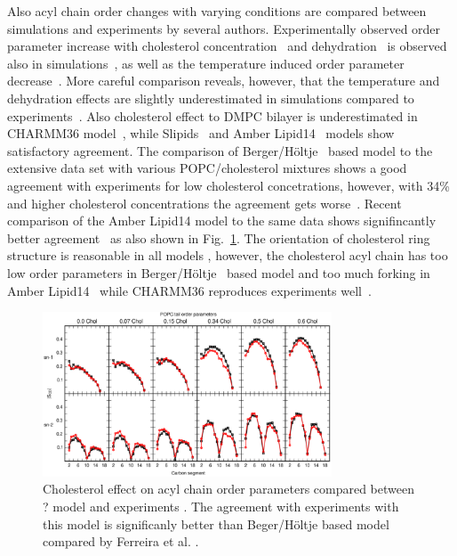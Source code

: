 \documentclass[aps,prl,superscriptaddress,twocolumn]{revtex4}
\begin{document}
Also acyl chain order changes with varying conditions are compared between simulations and experiments
by several authors. Experimentally observed order parameter increase with cholesterol 
concentration~\cite{dufourc84,lafleur90,douliez95,urbina95,vermeer07,ferreira13} and dehydration~\cite{mallikarjunaiah11,dvinskikh05b} 
is observed also in simulations~\cite{mashl01,hogberg06,vermeer07,zhu07,lim12,ferreira13,jambeck13,madej15},
as well as the temperature induced order parameter decrease~\cite{douliez95,zhuang14}.
More careful comparison reveals, however, that the temperature and dehydration effects are slightly underestimated in simulations 
compared to experiments~\cite{hogberg06,zhuang14}. Also cholesterol effect to DMPC bilayer is underestimated in CHARMM36 model~\cite{lim12},
while Slipids~\cite{jambeck13} and Amber Lipid14~\cite{madej15} models show satisfactory agreement.
The comparison of Berger/H{\"o}ltje~\cite{berger97,holtje01} based model to the extensive data set with various POPC/cholesterol mixtures shows a 
good agreement with experiments for low cholesterol concetrations, however, with 34\% and higher cholesterol concentrations the agreement gets worse~\cite{ferreira13}. 
Recent comparison of the Amber Lipid14 model to the same data shows signifincantly better agreement~\cite{madej15} as also
shown in Fig.~\ref{cholTAILmadej}. The orientation of cholesterol ring structure is reasonable in all models \cite{vermeer07,lim12,ferreira13,madej15}, 
however, the cholesterol acyl chain has too low order parameters in Berger/H{\"o}ltje~\cite{berger97,holtje01} based model and 
too much forking in Amber Lipid14~\cite{madej15} while CHARMM36 reproduces experiments well~\cite{lim12}. 
\begin{figure}[]
  \includegraphics[width=8.6cm]{../Fig/cholTAILmadej.eps}
\newline
  \caption{\label{cholTAILmadej}
    Cholesterol effect on acyl chain order parameters compared between ? model \cite{madej15} and experiments \cite{ferreira13}.
    The agreement with experiments with this model is significanly better than Beger/H{\"o}ltje based model compared by 
    Ferreira et al. \cite{ferreira13}.
  } 
\end{figure}
\end{document}
